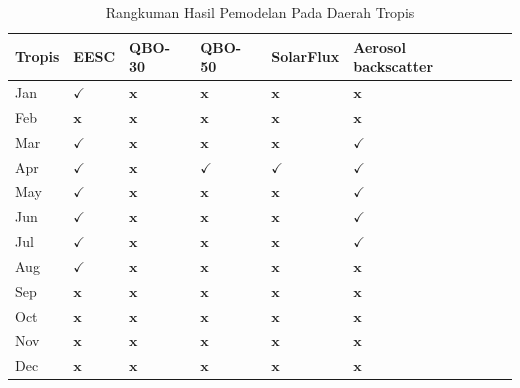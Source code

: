 \begin{enumerate}
\begin{table}[p]
\begin{tabular}{|l|l|l|l|l|l|l|}
\hline Tropis & EESC & QBO-30 & QBO-50 & SolarFlux & Aerosol backscatter \\
\hline Jan & $\checkmark$ & $\mathbf{x}$ & $\mathbf{x}$ & $\mathbf{x}$ & $\mathbf{x}$ \\
\hline Feb & $\mathbf{x}$ & $\mathbf{x}$ & $\mathbf{x}$ & $\mathbf{x}$ & $\mathbf{x}$ \\
\hline Mar & $\checkmark$ & $\mathbf{x}$ & $\mathbf{x}$ & $\mathbf{x}$ & $\checkmark$ \\
\hline Apr & $\checkmark$ & $\mathbf{x}$ & $\checkmark$ & $\checkmark$ & $\checkmark$ \\
\hline May & $\checkmark$ & $\mathbf{x}$ & $\mathbf{x}$ & $\mathbf{x}$ & $\checkmark$ \\
\hline Jun & $\checkmark$ & $\mathbf{x}$ & $\mathbf{x}$ & $\mathbf{x}$ & $\checkmark$ \\
\hline Jul & $\checkmark$ & $\mathbf{x}$ & $\mathbf{x}$ & $\mathbf{x}$ & $\checkmark$ \\
\hline Aug & $\checkmark$ & $\mathbf{x}$ & $\mathbf{x}$ & $\mathbf{x}$ & $\mathbf{x}$ \\
\hline Sep & $\mathbf{x}$ & $\mathbf{x}$ & $\mathbf{x}$ & $\mathbf{x}$ & $\mathbf{x}$ \\
\hline Oct & $\mathbf{x}$ & $\mathbf{x}$ & $\mathbf{x}$ & $\mathbf{x}$ & $\mathbf{x}$ \\
\hline Nov & $\mathbf{x}$ & $\mathbf{x}$ & $\mathbf{x}$ & $\mathbf{x}$ & $\mathbf{x}$ \\
\hline Dec & $\mathbf{x}$ & $\mathbf{x}$ & $\mathbf{x}$ & $\mathbf{x}$ & $\mathbf{x}$ \\
\hline
\end{tabular}

    \caption{Rangkuman Hasil Pemodelan Pada Daerah Tropis}
    \label{tab:tropis}
\end{table}


\begin{table}[p]
    \centering


\end{table}
\end{enumerate}
